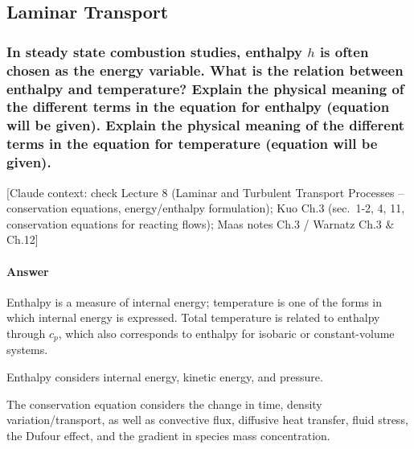 \subsection{Laminar Transport}

\subsubsection{In steady state combustion studies, enthalpy $h$ is often chosen as the energy variable. What is the relation between enthalpy and temperature? Explain the physical meaning of the different terms in the equation for enthalpy (equation will be given). Explain the physical meaning of the different terms in the equation for temperature (equation will be given).}

{\color{gray}\footnotesize [Claude context: check Lecture 8 (Laminar and Turbulent Transport Processes -- conservation equations, energy/enthalpy formulation); Kuo Ch.3 (sec.\ 1-2, 4, 11, conservation equations for reacting flows); Maas notes Ch.3 / Warnatz Ch.3 \& Ch.12]}

\paragraph{Answer}


Enthalpy is a measure of internal energy; temperature is one of the forms in which internal energy is expressed. Total temperature is related to enthalpy through $c_p$, which also corresponds to enthalpy for isobaric or constant-volume systems.

Enthalpy considers internal energy, kinetic energy, and pressure.

The conservation equation considers the change in time, density variation/transport, as well as convective flux, diffusive heat transfer, fluid stress, the Dufour effect, and the gradient in species mass concentration.


